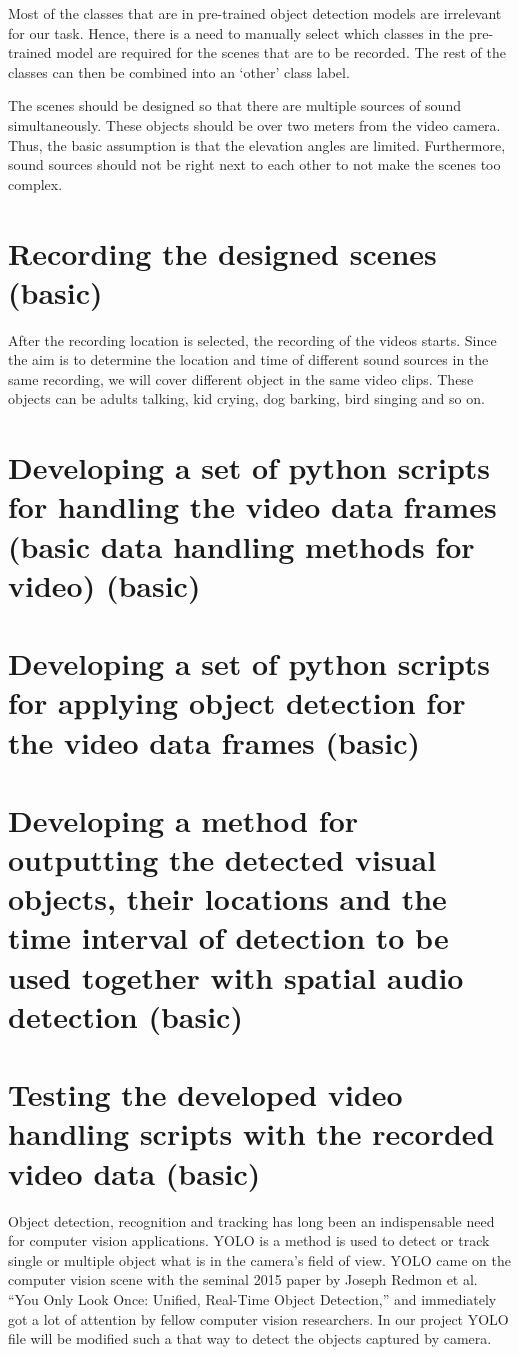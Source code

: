 Most of the classes that are in pre-trained object detection models are irrelevant for our task. Hence, there is a
need to manually select which classes in the pre-trained model are required for the scenes that are to be 
recorded. The rest of the classes can then be combined into an `other' class label.

The scenes should be designed so that there are multiple sources of sound simultaneously. These objects should
be over two meters from the video camera. Thus, the basic assumption is that the elevation angles are limited.
Furthermore, sound sources should not be right next to each other to not make the scenes too complex.

\section{Recording the designed scenes (basic)}
After the recording location is selected, the recording of the videos starts. Since the aim is to determine 
the location and time of different sound sources in the same recording, we will cover different object in the 
same video clips. These objects can be adults talking, kid crying, dog barking, bird singing and so on.

\section{Developing a set of python scripts for handling the video data frames (basic data handling methods for video) (basic)}

\section{Developing a set of python scripts for applying object detection for the video data frames (basic)}

\section{Developing a method for outputting the detected visual objects, their locations and the time interval of detection to be used together with spatial audio detection (basic)}

\section{Testing the developed video handling scripts with the recorded video data (basic)}
Object detection, recognition and tracking has long been an indispensable need for computer vision applications. 
YOLO is a method is used to detect or track single or multiple object what is in the camera's field of view. 
YOLO came on the computer vision scene with the seminal 2015 paper by Joseph Redmon et al. “You Only Look Once: Unified, Real-Time Object Detection,” 
and immediately got a lot of attention by fellow computer vision researchers. 
In our project YOLO file will be modified such a that way to detect the objects captured by camera.


